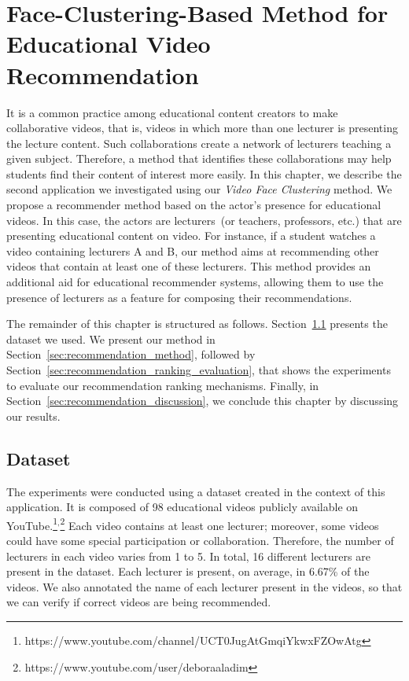 \newpage
\chapter{Face-Clustering-Based Method for Educational Video Recommendation}
\label{chap:educational_recommendation}

It is a common practice among educational content creators to make collaborative videos, that is, videos in which more than one lecturer is presenting the lecture content.
Such collaborations create a network of lecturers teaching a given subject.
Therefore, a method that identifies these collaborations may help students find their content of interest more easily.
In this chapter, we describe the second application we investigated using our \emph{Video Face Clustering} method.
We propose a recommender method based on the actor's presence for educational videos. In this case, the actors are lecturers~(or teachers, professors, etc.) that are presenting educational content on video.
For instance, if a student watches a video containing lecturers A and B, our method aims at recommending other videos that contain at least one of these lecturers. 
This method provides an additional aid for educational recommender systems, allowing them to use the presence of lecturers as a feature for composing their recommendations.

The remainder of this chapter is structured as follows.
Section~\ref{sec:recommendation_dataset} presents the dataset we used.
We present our method in Section~\ref{sec:recommendation_method}, followed by 
Section~\ref{sec:recommendation_ranking_evaluation}, that shows the experiments to evaluate our recommendation ranking mechanisms.
Finally, in Section~\ref{sec:recommendation_discussion}, we conclude this chapter by discussing our results.

\section{Dataset}
\label{sec:recommendation_dataset}

The experiments were conducted using a dataset created in the context of this application.
It is composed of 98 educational videos publicly available on YouTube.\footnote{https://www.youtube.com/channel/UCT0JugAtGmqiYkwxFZOwAtg}$^{,}$\footnote{https://www.youtube.com/user/deboraaladim}
Each video contains at least one lecturer; moreover, some videos could have some special participation or collaboration. Therefore, the number of lecturers in each video varies from 1 to 5. In total, 16 different lecturers are present in the dataset. Each lecturer is present, on average, in 6.67\% of the videos.
We also annotated the name of each lecturer present in the videos, so that we can verify if correct videos are being recommended.

